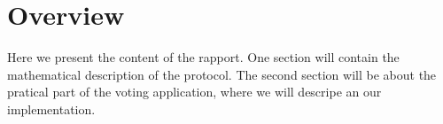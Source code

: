 \section{Overview}
Here we present the content of the rapport. One section will contain the mathematical description of the protocol. The second section will be about the pratical part of the voting application, where we will descripe an our implementation.
